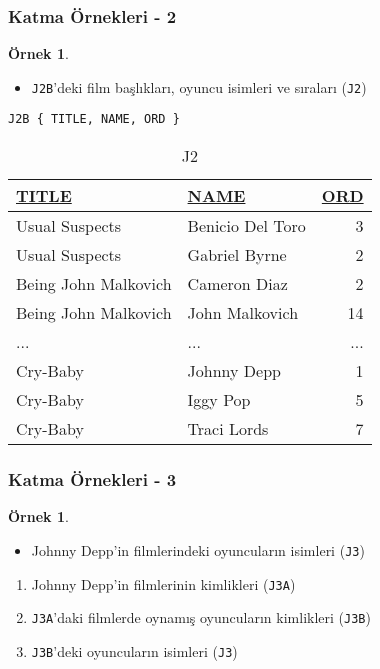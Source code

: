\documentclass[dvipsnames]{beamer}
\theoremstyle{definition}
\theoremstyle{example}
\newtheorem{ornek}[theorem]{Örnek}
\theoremstyle{plain}
\begin{document}
\begin{frame}[fragile]
  \frametitle{Katma Örnekleri - 2}

  \begin{ornek}
    \begin{itemize}
      \item \texttt{J2B}'deki film başlıkları, oyuncu isimleri ve sıraları
        (\texttt{J2})
    \end{itemize}

    \begin{lstlisting}
J2B { TITLE, NAME, ORD }
    \end{lstlisting}

    \pause
    \vspace{-10pt}
    \begin{tiny}
    \begin{table}
      \caption{J2}
      \begin{tabular}{|l|l|r|}\hline
\underline{TITLE}    & \underline{NAME} & \underline{ORD}\\[2pt]\hline\hline
Usual Suspects       & Benicio Del Toro &   3\\\hline
Usual Suspects       & Gabriel Byrne    &   2\\\hline
Being John Malkovich & Cameron Diaz     &   2\\\hline
Being John Malkovich & John Malkovich   &  14\\\hline
...                  & ...              & ...\\\hline
Cry-Baby             & Johnny Depp      &   1\\\hline
Cry-Baby             & Iggy Pop         &   5\\\hline
Cry-Baby             & Traci Lords      &   7\\\hline
      \end{tabular}
    \end{table}
    \end{tiny}
  \end{ornek}
\end{frame}

\begin{frame}
  \frametitle{Katma Örnekleri - 3}

  \begin{ornek}
    \begin{itemize}
      \item Johnny Depp'in filmlerindeki oyuncuların isimleri (\texttt{J3})
    \end{itemize}

    \pause
    \begin{enumerate}
      \item Johnny Depp'in filmlerinin kimlikleri (\texttt{J3A})

      \pause
      \item  \texttt{J3A}'daki filmlerde oynamış oyuncuların kimlikleri
        (\texttt{J3B})

      \pause
      \item \texttt{J3B}'deki oyuncuların isimleri (\texttt{J3})
    \end{enumerate}
  \end{ornek}
\end{frame}
\end{document}
